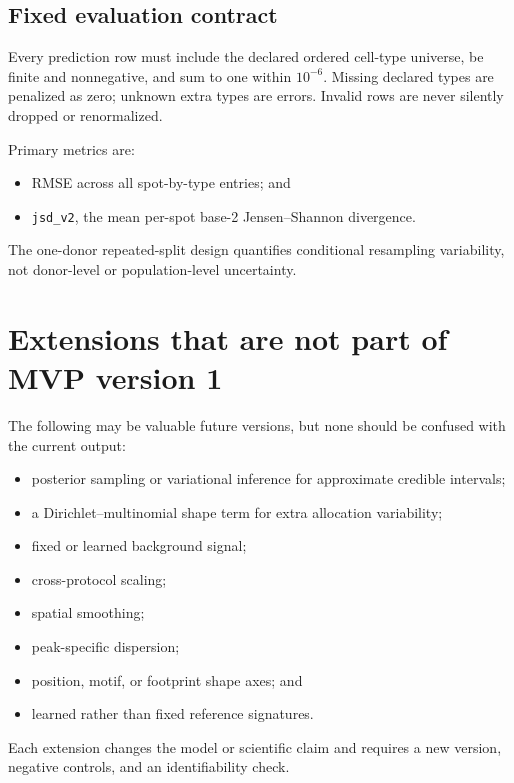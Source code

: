 \documentclass[11pt]{article}
\begin{document}
\subsection{Fixed evaluation contract}

Every prediction row must include the declared ordered cell-type universe, be
finite and nonnegative, and sum to one within \(10^{-6}\). Missing declared types
are penalized as zero; unknown extra types are errors. Invalid rows are never
silently dropped or renormalized.

Primary metrics are:

\begin{itemize}[leftmargin=2em]
  \item RMSE across all spot-by-type entries; and
  \item \texttt{jsd\_v2}, the mean per-spot base-2 Jensen--Shannon divergence.
\end{itemize}

The one-donor repeated-split design quantifies conditional resampling variability,
not donor-level or population-level uncertainty.

\section{Extensions that are not part of MVP version 1}

The following may be valuable future versions, but none should be confused with
the current output:

\begin{itemize}[leftmargin=2em]
  \item posterior sampling or variational inference for approximate credible intervals;
  \item a Dirichlet--multinomial shape term for extra allocation variability;
  \item fixed or learned background signal;
  \item cross-protocol scaling;
  \item spatial smoothing;
  \item peak-specific dispersion;
  \item position, motif, or footprint shape axes; and
  \item learned rather than fixed reference signatures.
\end{itemize}

Each extension changes the model or scientific claim and requires a new version,
negative controls, and an identifiability check.
\end{document}
